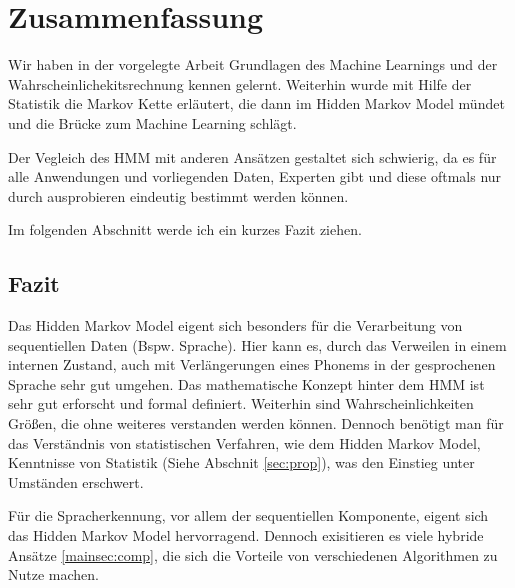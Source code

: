 \chapter{Zusammenfassung}  \label{mainsec:result}
Wir haben in der vorgelegte Arbeit Grundlagen des Machine Learnings und der Wahrscheinlichekitsrechnung kennen gelernt. Weiterhin wurde mit Hilfe der Statistik die Markov Kette erläutert, die dann im Hidden Markov Model mündet und die Brücke zum Machine Learning schlägt. 

Der Vegleich des HMM mit anderen Ansätzen gestaltet sich schwierig, da es für alle Anwendungen und vorliegenden Daten, Experten gibt und diese oftmals nur durch ausprobieren eindeutig bestimmt werden können. 

Im folgenden Abschnitt werde ich ein kurzes Fazit ziehen.


\section{Fazit}
Das Hidden Markov Model eigent sich besonders für die Verarbeitung von sequentiellen Daten (Bspw. Sprache). Hier kann es, durch das Verweilen in einem internen Zustand, auch mit Verlängerungen eines Phonems in der gesprochenen Sprache sehr gut umgehen. Das mathematische Konzept hinter dem HMM ist sehr gut erforscht und formal definiert. Weiterhin sind Wahrscheinlichkeiten Größen, die ohne weiteres verstanden werden können.
Dennoch benötigt man für das Verständnis von statistischen Verfahren, wie dem Hidden Markov Model, Kenntnisse von Statistik (Siehe Abschnit \ref{sec:prop}), was den Einstieg unter Umständen erschwert.

Für die Spracherkennung, vor allem der sequentiellen Komponente, eigent sich das Hidden Markov Model hervorragend. Dennoch exisitieren es viele hybride Ansätze \ref{mainsec:comp}, die sich die Vorteile von verschiedenen Algorithmen zu Nutze machen.
